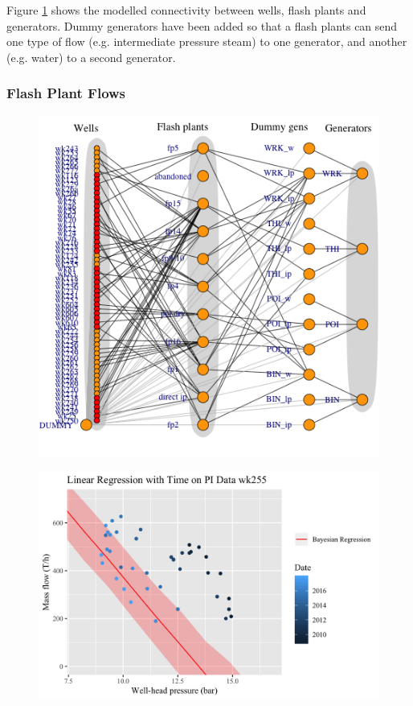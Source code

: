 \documentclass[a4paper, 12pt]{article}
\begin{document}
Figure \ref{fig:full_network} shows the modelled connectivity between wells, flash plants and generators. Dummy generators have been added so that a flash plants can send one type of flow (e.g. intermediate pressure steam) to one generator, and another (e.g. water) to a second generator.

\subsubsection{Flash Plant Flows}

\begin{figure}
\centering
\begin{minipage}[t]{.48\textwidth}
  \centering
  \includegraphics[width=\linewidth]{media/full_network}
  \label{fig:full_network}
\end{minipage}\hfill
\begin{minipage}[t]{.48\textwidth}
  \centering
  \includegraphics[width=\linewidth]{media/production_curve}

\end{minipage}
\end{figure}
\end{document}

